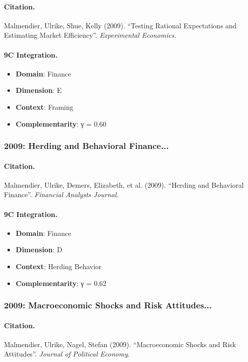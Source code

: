 \paragraph{Citation.}
Malmendier, Ulrike, Shue, Kelly (2009). ``Testing Rational Expectations and Estimating Market Efficiency''. \textit{Experimental Economics}.

\paragraph{9C Integration.}
\begin{itemize}[nosep]
  \item \textbf{Domain}: Finance
  \item \textbf{Dimension}: E
  \item \textbf{Context}: Framing
  \item \textbf{Complementarity}: γ = 0.60
\end{itemize}


\subsubsection{2009: Herding and Behavioral Finance...}

\paragraph{Citation.}
Malmendier, Ulrike, Demers, Elizabeth, et al. (2009). ``Herding and Behavioral Finance''. \textit{Financial Analysts Journal}.

\paragraph{9C Integration.}
\begin{itemize}[nosep]
  \item \textbf{Domain}: Finance
  \item \textbf{Dimension}: D
  \item \textbf{Context}: Herding Behavior
  \item \textbf{Complementarity}: γ = 0.62
\end{itemize}


\subsubsection{2009: Macroeconomic Shocks and Risk Attitudes...}

\paragraph{Citation.}
Malmendier, Ulrike, Nagel, Stefan (2009). ``Macroeconomic Shocks and Risk Attitudes''. \textit{Journal of Political Economy}.

